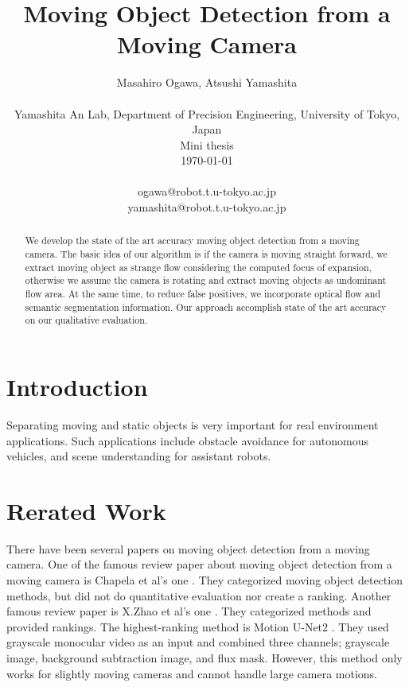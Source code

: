 \documentclass[10pt, twocolumn]{article}
\begin{document}
\title{Moving Object Detection from a Moving Camera}

\author{Masahiro Ogawa, Atsushi Yamashita \\
  \\
  Yamashita An Lab,
  Department of Precision Engineering,
  University of Tokyo, Japan\\
  Mini thesis\\
  \today
  \\
  \\
  ogawa@robot.t.u-tokyo.ac.jp\\
  yamashita@robot.t.u-tokyo.ac.jp}

\maketitle
\thispagestyle{empty}

\begin{abstract}
 We develop the state of the art accuracy moving object detection from a moving camera.
 The basic idea of our algorithm is if the camera is moving straight forward, we extract moving object as strange flow considering the computed focus of expansion, otherwise we assume the camera is rotating and extract moving objects as undominant flow area. At the same time, to reduce false positives, we incorporate optical flow and semantic segmentation information.
 Our approach accomplish state of the art accuracy on our qualitative evaluation.
\end{abstract}


\section{Introduction}
Separating moving and static objects is very important for real environment applications.
Such applications include obstacle avoidance for autonomous vehicles, and scene understanding for assistant robots.


\section{Rerated Work}
There have been several papers on moving object detection from a moving camera.
One of the famous review paper about moving object detection from a moving camera is Chapela et al's one \cite{chapel2020moving}.
They categorized moving object detection methods, but did not do quantitative evaluation nor create a ranking.
Another famous review paper is X.Zhao et al's one \cite{ZHAO202228}.
They categorized methods and provided rankings.
The highest-ranking method is Motion U-Net2 \cite{DBLP:conf/icpr/RahmonBSP20}.
They used grayscale monocular video as an input and combined three channels; grayscale image, background subtraction image, and flux mask.
However, this method only works for slightly moving cameras and cannot handle large camera motions.
\end{document}
